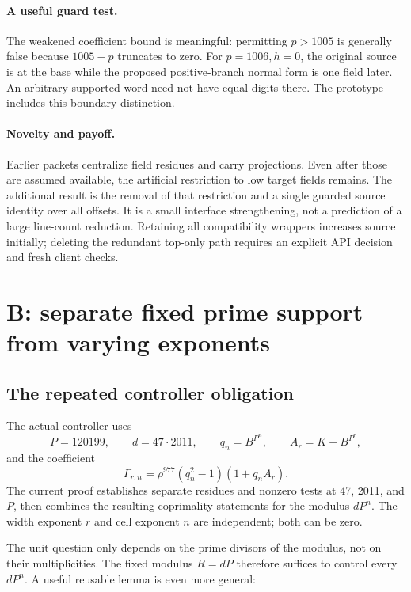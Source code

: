 \documentclass[11pt]{article}
\begin{document}
\paragraph{A useful guard test.}
The weakened coefficient bound is meaningful: permitting \(p>1005\) is
generally false because \(1005-p\) truncates to zero. For \(p=1006,h=0\),
the original source is at the base while the proposed positive-branch
normal form is one field later. An arbitrary supported word need not have
equal digits there. The prototype includes this boundary distinction.

\paragraph{Novelty and payoff.}
Earlier packets centralize field residues and carry projections. Even after
those are assumed available, the artificial restriction to low target fields
remains. The additional result is the removal of that restriction and a
single guarded source identity over all offsets. It is a small interface
strengthening, not a prediction of a large line-count reduction. Retaining
all compatibility wrappers increases source initially; deleting the
redundant top-only path requires an explicit API decision and fresh client
checks.

\section{B: separate fixed prime support from varying exponents}

\subsection{The repeated controller obligation}

The actual controller uses
\[
P=120199,\qquad d=47\cdot2011,\qquad
q_n=B^{P^n},\qquad A_r=K+B^{P^r},
\]
and the coefficient
\begin{equation}\label{eq:gamma}
\Gamma_{r,n}=\rho^{977}(q_n^2-1)(1+q_nA_r).
\end{equation}
The current proof establishes separate residues and nonzero tests at 47,
2011, and \(P\), then combines the resulting coprimality statements for the
modulus \(dP^n\). The width exponent \(r\) and cell exponent \(n\) are
independent; both can be zero.\cite{units}

The unit question only depends on the prime divisors of the modulus, not
on their multiplicities. The fixed modulus \(R=dP\) therefore suffices to
control every \(dP^n\). A useful reusable lemma is even more general:
\end{document}
